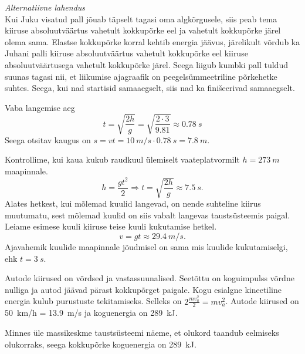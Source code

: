 \documentclass[10pt, twoside]{article}
\begin{document}
{\vspace{0.5\baselineskip}

\emph{Alternatiivne lahendus}\\
Kui Juku visatud pall jõuab täpselt tagasi oma algkõrgusele, siis peab tema kiiruse absoluutväärtus vahetult kokkupõrke eel ja vahetult kokkupõrke järel olema sama. Elastse kokkupõrke korral kehtib energia jäävus, järelikult võrdub ka Juhani palli kiiruse absoluutväärtus vahetult kokkupõrke eel kiiruse absoluutväärtusega vahetult kokkupõrke järel. Seega liigub kumbki pall tuldud suunas tagasi nii, et liikumise ajagraafik on peegelsümmeetriline põrkehetke suhtes. Seega, kui nad startisid samaaegselt, siis nad ka finišeerivad samaaegselt.
\probend
\bigskip


\solu
Vaba langemise aeg
\[
t=\sqrt{\frac{2 h}{g}}=\sqrt{\frac{2 \cdot 3}{\num{9,81}}} \approx \SI{0,78}{s}
\]
Seega otsitav kaugus on $s = vt = \SI{10}{m/s} \cdot \SI{0,78}{s} = \SI{7,8}{m}$.
\probend
\bigskip


\solu
Kontrollime, kui kaua kukub raudkuul ülemiselt vaateplatvormilt $h=\SI{273}{m}$ maapinnale.
\[h=\frac{gt^2}{2} \Rightarrow t=\sqrt{\frac{2h}{g}}\approx \SI{7.5}{s}.\]
Alates hetkest, kui mõlemad kuulid langevad, on nende suhteline kiirus muutumatu, sest mõlemad kuulid on siis vabalt langevas taustsüsteemis paigal.
Leiame esimese kuuli kiiruse teise kuuli kukutamise hetkel.
\[v=gt\approx \SI{29.4}{m/s}.\]
Ajavahemik kuulide maapinnale jõudmisel on sama mis kuulide kukutamiselgi, ehk $t=\SI{3}{s}$.
\probend
\bigskip


\solu
\osa Autode kiirused on võrdsed ja vastassuunalised. Seetõttu on koguimpulss võrdne nulliga ja autod jäävad pärast kokkupõrget paigale. Kogu esialgne kineetiline energia kulub purustuste tekitamiseks. Selleks on $2 \frac{m v_{a}^{2}}{2}=m v_{a}^{2}$. Autode kiirused on \SI{50}{km/h} = \SI{13,9}{m/s} ja koguenergia on \SI{289}{kJ}.

\osa Minnes üle massikeskme taustsüsteemi näeme, et olukord taandub eelmiseks olukorraks, seega kokkupõrke koguenergia on \SI{289}{kJ}.
\probend
\bigskip

}
\end{document}
